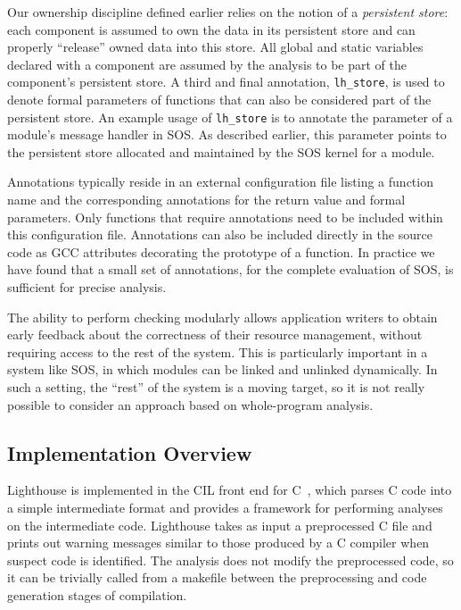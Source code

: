 Our ownership discipline defined earlier relies on the notion of a {\em
persistent store}:  each component is assumed to own the data in its
persistent store and can properly ``release'' owned data into this store.
%
All global and static variables declared with a component are assumed by the
analysis to be part of the component's persistent store.
%
A third and final annotation, {\tt lh\_store}, is used to denote formal
parameters of functions that can also be considered part of the persistent
store.
%
An example usage of {\tt lh\_store} is to annotate the 
parameter of a module's message handler in SOS.
%
As described earlier, this parameter points to the persistent store
allocated and maintained by the SOS kernel for a module.



Annotations typically reside in an external configuration file listing a
function name and the corresponding annotations for the return value and
formal parameters.
%
Only functions that require annotations need to be included within this
configuration file.
%
Annotations can also be included directly in the source code as GCC
attributes decorating the prototype of a function.
%
In practice we have found that a small set of annotations, \numannote for
the complete evaluation of SOS, is sufficient for precise analysis. 



The ability to perform checking modularly allows application writers to
obtain early feedback about the correctness of their resource management,
without requiring access to the rest of the system.  
%
This is particularly important in a system like SOS, in which modules can be
linked and unlinked dynamically.  
%
In such a setting, the ``rest'' of the system is a moving target, so it is
not really possible to consider an approach based on whole-program analysis.



\subsection{Implementation Overview}



Lighthouse is implemented in the CIL front end for C~\cite{CIL}, which
parses C code into a simple intermediate format and provides a framework for
performing analyses on the intermediate code. 
%
Lighthouse takes as input a preprocessed C file and prints out warning
messages similar to those produced by a C compiler when suspect code is
identified.
%
The analysis does not modify the preprocessed code, so it can be trivially
called from a makefile between the preprocessing and code generation stages
of compilation.



